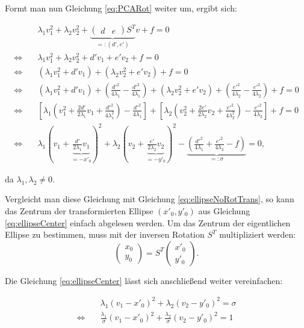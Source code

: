 Formt man nun Gleichung \ref{eq:PCARot} weiter um, ergibt sich:

\begin{equation}\label{eq:ellipseCenter}
\begin{aligned}
&\lambda_1v_1^2 + \lambda_2v_2^2 + \underbrace{\begin{pmatrix}d & e\end{pmatrix}S^T}_{=:(d', e')}v + f = 0 \\
\Leftrightarrow\quad &\lambda_1v_1^2 + \lambda_2v_2^2 + d'v_1 + e'v_2 + f = 0 \\
\Leftrightarrow\quad &(\lambda_1v_1^2 + d'v_1)+ (\lambda_2v_2^2 + e'v_2) + f = 0\\
\Leftrightarrow\quad &(\lambda_1v_1^2 + d'v_1) + (\frac{d'^2}{4\lambda_1} - \frac{d'^2}{4\lambda_1}) + (\lambda_2v_2^2 + e'v_2) + (\frac{e'^2}{4\lambda_2} - \frac{e'^2}{4\lambda_2}) + f = 0 \\
\Leftrightarrow\quad &\left[\lambda_1\left(v_1^2 + \frac{2d'}{2\lambda_1}v_1 + \frac{d'^2}{4\lambda_1^2}\right) - \frac{d'^2}{4\lambda_1}\right] +\left[\lambda_2\left(v_2^2 + \frac{2e'}{2\lambda_2}v_2 + \frac{e'^2}{4\lambda_2^2}\right) - \frac{e'^2}{4\lambda_2}\right] + f = 0 \\
\Leftrightarrow\quad &\lambda_1(v_1 + \underbrace{\frac{d'}{2\lambda_1}v_1}_{ = -x'_0})^2 +\lambda_2(v_2 + \underbrace{\frac{e'}{2\lambda_2}v_2}_{ = -y'_0})^2 - \underbrace{(\frac{d'^2}{4\lambda_1} + \frac{e'^2}{4\lambda_2} - f)}_{=:\sigma} = 0,
\end{aligned}
\end{equation}

da $\lambda_1, \lambda_2 \neq 0$.

Vergleicht man diese Gleichung mit Gleichung \ref{eq:ellipseNoRotTrans}, so kann das Zentrum der transformierten Ellipse $(x'_0, y'_0)$ aus Gleichung \ref{eq:ellipseCenter} einfach abgelesen werden.
Um das Zentrum der eigentlichen Ellipse zu bestimmen, muss mit der inversen Rotation $S^T$ multipliziert werden:
\[
\begin{pmatrix} x_0 \\ y_0 \end{pmatrix} = S^T \begin{pmatrix} x'_0 \\ y'_0 \end{pmatrix}.
\]

Die Gleichung \ref{eq:ellipseCenter} lässt sich anschließend weiter vereinfachen:

\begin{equation} \label{eq:PCAKoeff}
\begin{aligned}
&\lambda_1(v_1 -x'_0)^2 +\lambda_2(v_2 -y'_0)^2 = \sigma \\
\Leftrightarrow\quad & \frac{\lambda_1}{\sigma}(v_1 -x'_0)^2 +\frac{\lambda_2}{\sigma}(v_2 -y'_0)^2  =1
\end{aligned}
\end{equation}

